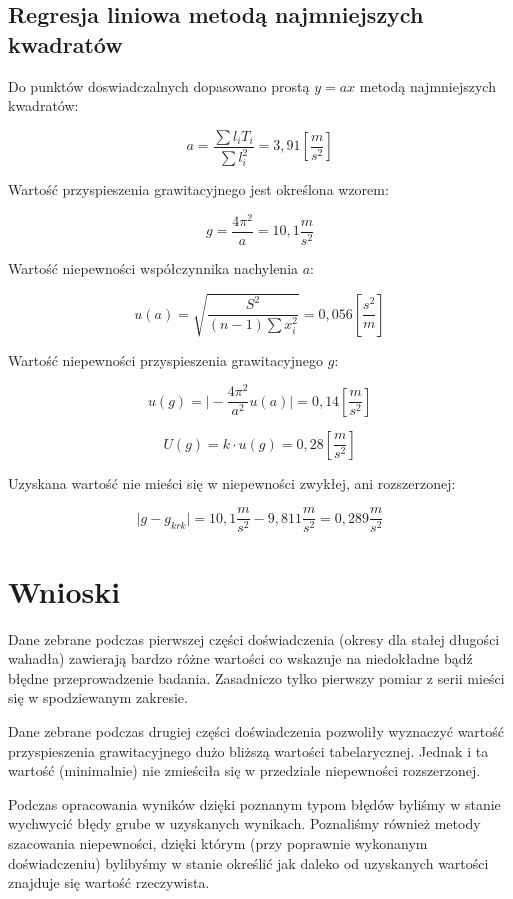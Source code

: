 \documentclass[a4paper,10pt,twoside]{article}
\begin{document}
\subsection{Regresja liniowa metodą najmniejszych kwadratów}

Do punktów doswiadczalnych dopasowano prostą $y = a x$ metodą najmniejszych kwadratów:

$$ a = \frac{\sum l_i T_i}{\sum l_i^2} = 3,91 \unit{[\frac{m}{s^2}]} $$

Wartość przyspieszenia grawitacyjnego jest określona wzorem:

$$ g = \frac{4 \pi^2}{a} = 10,1 \unit{\frac{m}{s^2}}$$

Wartość niepewności współczynnika nachylenia $a$:

$$ u(a) = \sqrt{ \frac{S^2}{(n - 1)\sum x_i^2} } = 0,056 \unit{[\frac{s^2}{m}]}$$

Wartość niepewności przyspieszenia grawitacyjnego $g$:

$$ u(g) = \vert - \frac{4 \pi^2}{a^2} u(a) \vert = 0,14 \unit{[\frac{m}{s^2}]}$$

$$ U(g) = k \cdot u(g) = 0,28 \unit{[\frac{m}{s^2}]}$$

Uzyskana wartość nie mieści się w niepewności zwykłej, ani rozszerzonej:

$$ \vert g - g_{krk} \vert = 10,1 \unit{\frac{m}{s^2}} - 9,811 \unit{\frac{m}{s^2}} = 0,289 \unit{\frac{m}{s^2}}$$

\section{Wnioski}

Dane zebrane podczas pierwszej części doświadczenia (okresy dla stałej długości wahadła) zawierają bardzo różne wartości co wskazuje na niedokładne bądź błędne przeprowadzenie badania. Zasadniczo tylko pierwszy pomiar z serii mieści się w spodziewanym zakresie.

Dane zebrane podczas drugiej części doświadczenia pozwoliły wyznaczyć wartość przyspieszenia grawitacyjnego dużo bliższą wartości tabelarycznej. Jednak i ta wartość (minimalnie) nie zmieściła się w przedziale niepewności rozszerzonej.

Podczas opracowania wyników dzięki poznanym typom błędów byliśmy w stanie wychwycić błędy grube w uzyskanych wynikach. Poznaliśmy również metody szacowania niepewności, dzięki którym (przy poprawnie wykonanym doświadczeniu) bylibyśmy w stanie określić jak daleko od uzyskanych wartości znajduje się wartość rzeczywista.
\end{document}
